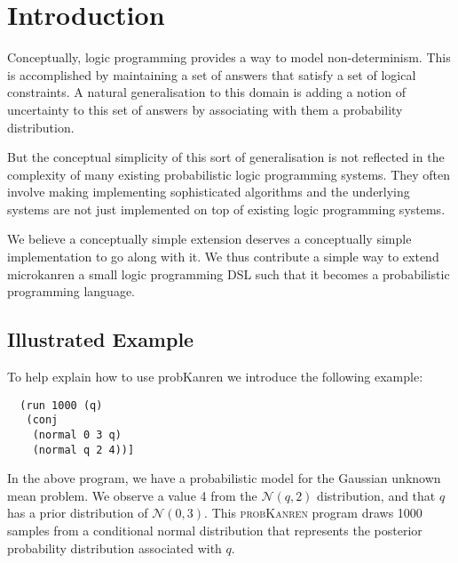 \documentclass[
]{ceurart}
\begin{document}
\maketitle

\section{Introduction}

Conceptually, logic programming provides a way to model
non-determinism. This is accomplished by maintaining a set of answers
that satisfy a set of logical constraints. A natural generalisation
to this domain is adding a notion of uncertainty to this set of answers
by associating with them a probability distribution.

But the conceptual simplicity of this sort of generalisation is not reflected
in the complexity of many existing probabilistic logic programming systems.
They often involve making implementing sophisticated algorithms and the underlying
systems are not just implemented on top of existing logic programming systems.

We believe a conceptually simple extension deserves a conceptually
simple implementation to go along with it. We thus contribute a simple
way to extend microkanren a small logic programming DSL such that it
becomes a probabilistic programming language.

\subsection{Illustrated Example}

To help explain how to use probKanren we introduce the following example:


\begin{verbatim}
  (run 1000 (q)
   (conj
    (normal 0 3 q)
    (normal q 2 4))]
\end{verbatim}


In the above program, we have a probabilistic model for the Gaussian
unknown mean problem. We observe a value 4 from the $\mathcal{N}(q,2)$
distribution, and that $q$ has a prior distribution of $\mathcal{N}(0, 3)$.
This \textsc{probKanren} program draws 1000 samples from a conditional normal distribution
that represents the posterior probability distribution associated with $q$.
\end{document}

